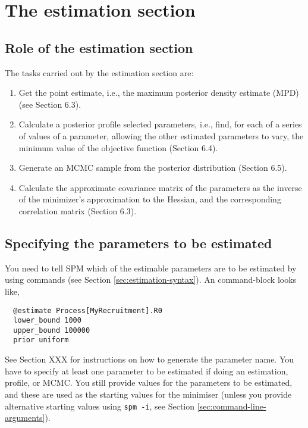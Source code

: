 \section{The estimation section\label{sec:estimation-section}}

\subsection{Role of the estimation section\label{sec:role-of-the-estimation-section}}

The tasks carried out by the estimation section are: 

\begin{enumerate}
\item Get the point estimate, i.e., the maximum posterior density estimate (MPD) (see Section 6.3).

\item Calculate a posterior profile selected parameters, i.e., find, for each of a series of values of a parameter, allowing the other estimated parameters to vary, the minimum value of the objective function (Section 6.4).

\item Generate an MCMC sample from the posterior distribution (Section 6.5).

\item Calculate the approximate covariance matrix of the parameters as the inverse of the minimizer\textquoteright{}s approximation to the Hessian, and the corresponding correlation matrix (Section 6.3).
\end{enumerate}

\subsection{Specifying the parameters to be estimated}

You need to tell SPM which of the estimable parameters are to be estimated by using  commands (see Section \ref{sec:estimation-syntax}). An  command-block looks like,

\begin{verbatim}
  @estimate Process[MyRecruitment].R0
  lower_bound 1000
  upper_bound 100000
  prior uniform
\end{verbatim}

See Section XXX for instructions on how to generate the parameter name. You have to specify at least one parameter to be estimated if doing an estimation, profile, or MCMC. You still provide values for the parameters to be estimated, and these are used as the starting values for the minimiser (unless you provide alternative starting values using \texttt{spm -i}, see Section \ref{sec:command-line-arguments}).

